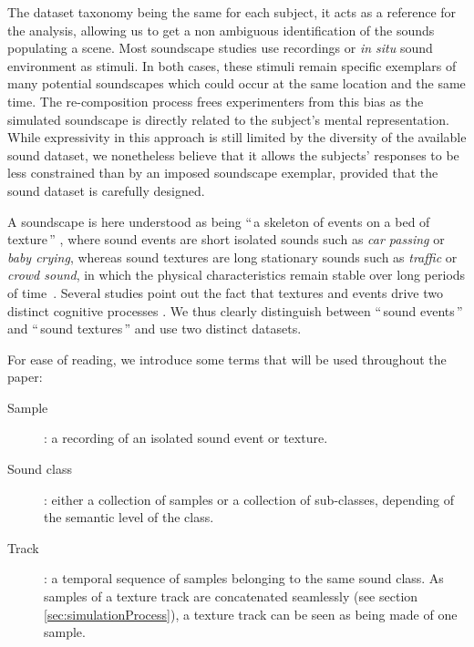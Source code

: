 \documentclass[twoside,twocolumn]{article}
\begin{document}
The dataset taxonomy being the same for each subject, it acts as a reference for the analysis, allowing us to get a non ambiguous identification of the sounds populating a scene. Most soundscape studies use recordings or \textit{in situ} sound environment as stimuli. In both cases, these stimuli remain specific exemplars of many potential soundscapes which could occur at the same location and the same time. The re-composition process frees experimenters from this bias as the simulated soundscape is directly related to the subject's mental representation. While expressivity in this approach is still limited by the diversity of the available sound dataset, we nonetheless believe that it allows the subjects' responses to be less constrained than by an imposed soundscape exemplar, provided that the sound dataset is carefully designed.

A soundscape  is here understood as being  ``\,a skeleton of events on a bed of texture\,'' \cite{nelken_ear_2013}, where sound events are short isolated sounds such as \textit{car passing} or \textit{baby crying}, whereas sound textures are long stationary  sounds such as \textit{traffic} or \textit{crowd sound}, in which the physical characteristics remain stable over long periods of time~\cite{saint-arnaud_classification_1995}. Several studies point out the fact that textures and events drive two distinct cognitive processes \cite{maffiolo_caracterisation_1999, mcdermott2013summary}. We thus clearly distinguish between ``\,sound events\,'' and ``\,sound textures\,'' and use two distinct datasets. 

For ease of reading, we introduce some terms that will be used throughout the paper:

\begin{description}
\item[Sample]: a recording of an isolated sound event or texture.
\item[Sound class]: either a collection of samples or a collection of sub-classes, depending of the semantic level of the class.
\item[Track]: a temporal sequence of samples belonging to the same sound class. As samples of a texture track are concatenated seamlessly (see section \ref{sec:simulationProcess}), a texture track can be seen as being made of one sample.
\end{description}
\end{document}
